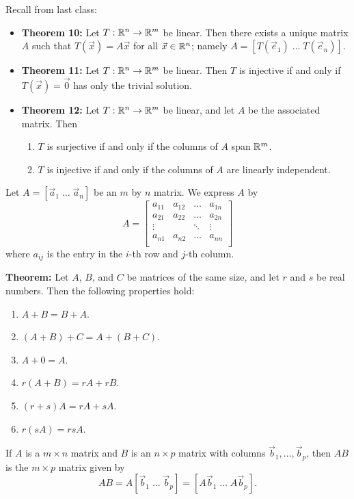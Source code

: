 \documentclass[12pt,letterpaper]{article}
\begin{document}
\thispagestyle{fancy}

Recall from last class:

\begin{itemize}

\item {\bf Theorem 10:} Let $T: \mathbb{R}^n \to \mathbb{R}^m$ be linear. Then there exists a unique matrix $A$ such that $T(\vec{x})=A\vec{x}$ for all $\vec{x} \in \mathbb{R}^n$; namely $A=[T(\vec{e}_1) \; \dots \; T(\vec{e}_n)]$.
\item {\bf Theorem 11:} Let $T: \mathbb{R}^n \to \mathbb{R}^m$ be linear. Then $T$ is injective if and only if $T(\vec{x})=\vec{0}$ has only the trivial solution.
\item {\bf Theorem 12:} Let $T: \mathbb{R}^n \to \mathbb{R}^m$ be linear, and let $A$ be the associated matrix. Then 
\begin{enumerate}
\item $T$ is surjective if and only if the columns of $A$ span $\mathbb{R}^m$.
\item $T$ is injective if and only if the columns of $A$ are linearly independent. 
\end{enumerate}
\end{itemize}

\newpage

Let $A=[\vec{a}_1 \; \dots \; \vec{a}_n]$ be an $m$ by $n$ matrix. We express $A$ by
$$A=\begin{bmatrix}
a_{11} & a_{12} & \hdots & a_{1n}\\ 
a_{21} & a_{22} & \hdots & a_{2n}\\ 
\vdots & & \ddots & \vdots\\
a_{n1} & a_{n2} & \hdots & a_{nn}\\ 
\end{bmatrix}$$
where $a_{ij}$ is the entry in the $i$-th row and $j$-th column.

{\bf Theorem:} Let $A$, $B$, and $C$ be matrices of the same size, and let $r$ and $s$ be real numbers. Then the following properties hold:
\begin{enumerate}
\item $A+B=B+A$.
\item $(A+B)+C=A+(B+C)$.
\item $A+0=A$.
\item $r(A+B)=rA+rB$.
\item $(r+s)A=rA+sA$.
\item $r(sA)=rsA$.
\end{enumerate}

\begin{defn}
If $A$ is a $m\times n$ matrix and $B$ is an $n\times p$ matrix with columns $\vec{b}_1, \dots, \vec{b}_p$, then $AB$ is the $m \times p$ matrix given by $$AB=A[\vec{b}_1 \; \dots \; \vec{b}_p]=[A\vec{b}_1 \; \dots \; A\vec{b}_p].$$
\end{defn}
\end{document}
